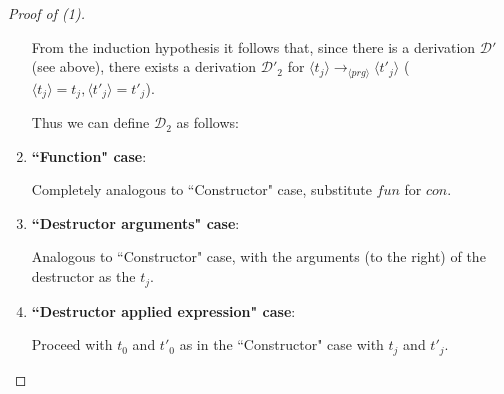 \documentclass[11pt]{article} %
\begin{document}
\begin{proof}[Proof of (1)]
\begin{enumerate}
From the induction hypothesis it follows that, since there is a derivation $\mathcal{D'}$ (see above), there exists a derivation $\mathcal{D'}_2$ for $\langle t_j \rangle \longrightarrow_{\langle prg \rangle} \langle t'_j \rangle$ ($\langle t_j \rangle = t_j, \langle t'_j \rangle = t'_j$).

Thus we can define $\mathcal{D}_2$ as follows:

\begin{prooftree}
\end{prooftree}

\item \textbf{``Function" case}:

Completely analogous to ``Constructor" case, substitute $fun$ for $con$.

\item \textbf{``Destructor arguments" case}:

Analogous to ``Constructor" case, with the arguments (to the right) of the destructor as the $t_j$.

\item \textbf{``Destructor applied expression" case}:

\begin{prooftree}
\end{prooftree}

Proceed with $t_0$ and $t'_0$ as in the ``Constructor" case with $t_j$ and $t'_j$.

\end{enumerate}

\end{proof}
\end{document}

